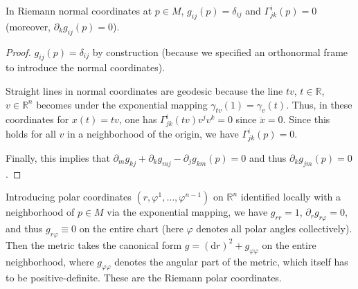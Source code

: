 \documentclass[english,letterpaper]{article}%
\numberwithin{equation}{section}
\numberwithin{figure}{section}
\numberwithin{table}{section}
\theoremstyle{definition}
\theoremstyle{definition}
\theoremstyle{definition}
\theoremstyle{plain}
\theoremstyle{plain}
\theoremstyle{plain}
\theoremstyle{plain}
\theoremstyle{remark}
\theoremstyle{remark}
\def\red{\color{red}}
\newcommand{\dd}{{\mathrm{d}}}
\newcommand{\PRLsep}{   %
           \noindent\makebox[\linewidth]{
                \resizebox{0.5\linewidth}{1pt}{$\blacklozenge$}}}
\begin{document}
\begin{prop}
    In Riemann normal coordinates at $p\in M$, $g_{ij}(p)=\delta_{ij}$ and $\Gamma^i_{jk}(p)=0$ (moreover, $\partial_k g_{ij}(p)=0$).
\end{prop}
\begin{proof}
    $g_{ij}(p)=\delta_{ij}$ by construction (because we specified an orthonormal frame to introduce the normal coordinates).
    
    Straight lines in normal coordinates are geodesic because the line $tv$, $t\in\mathbb{R}$, $v\in\mathbb{R}^n$ becomes under the exponential mapping $\gamma_{tv}(1)=\gamma_v(t)$. Thus, in these coordinates for $x(t)=tv$, one has $\Gamma^i_{jk}(tv)v^jv^k=0$ since $\ddot x=0$. Since this holds for all $v$ in a neighborhood of the origin, we have $\Gamma^i_{jk}(p)=0$. 
    
    Finally, this implies that $\partial_m g_{kj}+\partial_k g_{mj}-\partial_j g_{km}(p)=0$ and thus $\partial_k g_{jm}(p)=0$.
\end{proof}

\begin{defn}
    Introducing polar coordinates $(r,\varphi^1,\ldots,\varphi^{n-1})$ on $\mathbb{R}^n$ identified locally with a neighborhood of $p\in M$ via the exponential mapping, we have $g_{rr}=1$, $\partial_r g_{r\varphi}=0$, and thus $g_{r\varphi}\equiv 0$ on the entire chart (here $\varphi$ denotes all polar angles collectively). Then the metric takes the canonical form $g=(\dd r)^2+g_{\varphi\varphi}$ on the entire neighborhood, where $g_{\varphi\varphi}$ denotes the angular part of the metric, which itself has to be positive-definite. These are the Riemann polar coordinates.
\end{defn}
\end{document}

